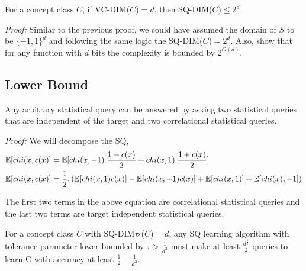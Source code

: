 \begin{proposition}
    For a concept class $C$, if VC-DIM($C$)$ = d$, then SQ-DIM($C$)$ \leq 2^d$.
\end{proposition}

\textit{Proof:} Similar to the previous proof, we could have assumed the domain of $S$ to be $\{-1, 1\}^d$ and following the same logic the SQ-DIM($C$)$ = 2^d$. Also, \cite{braverman_interactive_2012} show that for any function with $d$ bits the complexity is bounded by $2^{O(d)}$.





\subsection{Lower Bound}
\begin{lemma}
\label{sq_csq_rel}
Any arbitrary statistical query can be answered by asking two statistical queries that are independent of the target and two correlational statistical queries.
\end{lemma}

\textit{Proof:} We will decompose the SQ,
\begin{align*}
    \mathbb E[chi(x, c(x)] &= \mathbb E[chi(x, -1).\frac{1-c(x)}{2} + chi(x, 1).\frac{1+c(x)}{2}] \\
    \mathbb E[chi(x, c(x)] &= \frac{1}{2}.\left(\mathbb E[chi(x, 1)c(x)] - \mathbb E[chi(x, -1)c(x)] + \mathbb E[chi(x, 1)] + \mathbb E[chi(x), -1]\right)
\end{align*}

The first two terms in the above equation are correlational statistical queries and the last two terms are target independent statistical queries.

\begin{theorem}
\label{lower_bound_orig}
For a concept class $C$ with SQ-DIM$_{\mathcal{D}}$($C$)$ = d$, any SQ learning algorithm with tolerance parameter lower bounded by $\tau > \frac{1}{d^3}$ must make at least $\frac{d^\frac{1}{3}}{2}$ queries to learn C with accuracy at least $\frac{1}{2} - \frac{1}{d^3}$.
\end{theorem}


